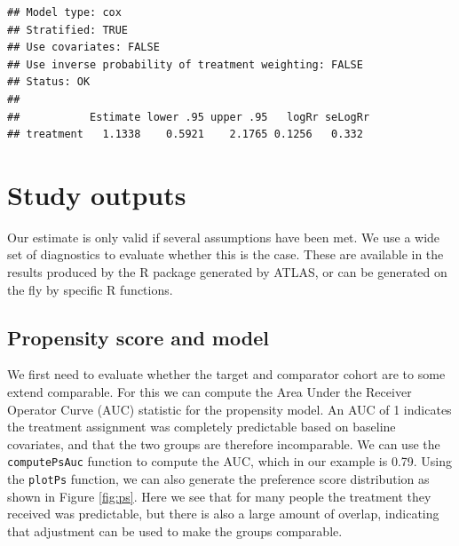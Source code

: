 \documentclass[11pt]{book}
\newenvironment{Shaded}{\begin{snugshade}}{\end{snugshade}}
\newcommand{\KeywordTok}[1]{\textcolor[rgb]{0.13,0.29,0.53}{\textbf{#1}}}
\newcommand{\DecValTok}[1]{\textcolor[rgb]{0.00,0.00,0.81}{#1}}
\newcommand{\StringTok}[1]{\textcolor[rgb]{0.31,0.60,0.02}{#1}}
\newcommand{\OperatorTok}[1]{\textcolor[rgb]{0.81,0.36,0.00}{\textbf{#1}}}
\newcommand{\NormalTok}[1]{#1}
\begin{document}
\begin{Shaded}
\end{Shaded}

\begin{verbatim}
## Model type: cox
## Stratified: TRUE
## Use covariates: FALSE
## Use inverse probability of treatment weighting: FALSE
## Status: OK
## 
##           Estimate lower .95 upper .95   logRr seLogRr
## treatment   1.1338    0.5921    2.1765 0.1256   0.332
\end{verbatim}

\section{Study outputs}\label{studyOutputs}

Our estimate is only valid if several assumptions have been met. We use
a wide set of diagnostics to evaluate whether this is the case. These
are available in the results produced by the R package generated by
ATLAS, or can be generated on the fly by specific R functions.

\subsection{Propensity score and
model}\label{propensity-score-and-model}

We first need to evaluate whether the target and comparator cohort are
to some extend comparable. For this we can compute the Area Under the
Receiver Operator Curve (AUC) statistic for the propensity model. An AUC
of 1 indicates the treatment assignment was completely predictable based
on baseline covariates, and that the two groups are therefore
incomparable. We can use the \texttt{computePsAuc} function to compute
the AUC, which in our example is 0.79. Using the \texttt{plotPs}
function, we can also generate the preference score distribution as
shown in Figure \ref{fig:ps}. Here we see that for many people the
treatment they received was predictable, but there is also a large
amount of overlap, indicating that adjustment can be used to make the
groups comparable.
\end{document}
